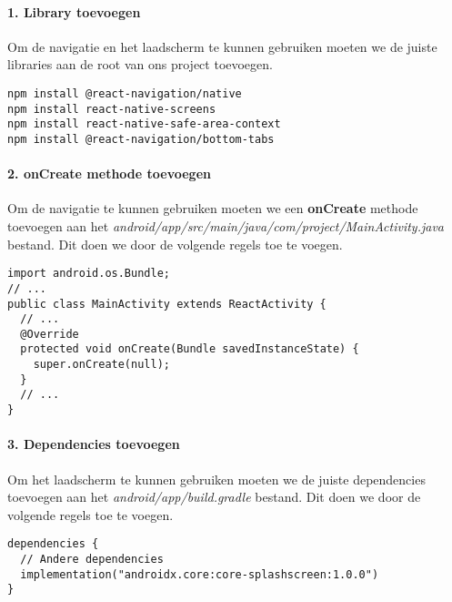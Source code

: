 \paragraph{1. Library toevoegen}
Om de navigatie en het laadscherm te kunnen gebruiken moeten we de juiste libraries aan 
de root van ons project toevoegen.
\begin{verbatim}
npm install @react-navigation/native
npm install react-native-screens
npm install react-native-safe-area-context
npm install @react-navigation/bottom-tabs
\end{verbatim}

\paragraph{2. onCreate methode toevoegen}
Om de navigatie te kunnen gebruiken moeten we een \textbf{onCreate} methode toevoegen aan het
\textit{android/app/src/main/java/com/project/MainActivity.java} bestand. Dit doen we door de 
volgende regels toe te voegen.
\begin{verbatim}
import android.os.Bundle;
// ...
public class MainActivity extends ReactActivity {
  // ...
  @Override
  protected void onCreate(Bundle savedInstanceState) {
    super.onCreate(null);
  }
  // ...
}
\end{verbatim}

\paragraph{3. Dependencies toevoegen}
Om het laadscherm te kunnen gebruiken moeten we de juiste dependencies toevoegen aan het
\textit{android/app/build.gradle} bestand. Dit doen we door de volgende regels toe te voegen.
\begin{verbatim}
dependencies {
  // Andere dependencies
  implementation("androidx.core:core-splashscreen:1.0.0")
}
\end{verbatim}

